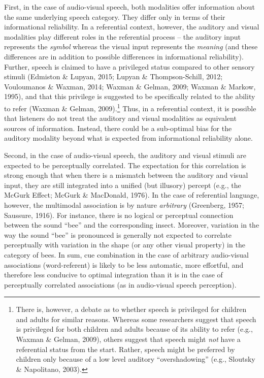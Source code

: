 \documentclass[english,,man,floatsintext]{apa6}
\let\rmarkdownfootnote\footnote%
\def\footnote{\protect\rmarkdownfootnote}
\theoremstyle{definition}
\theoremstyle{definition}
\theoremstyle{definition}
\theoremstyle{remark}
\begin{document}
First, in the case of audio-visual speech, both modalities offer
information about the same underlying speech category. They differ only
in terms of their informational reliability. In a referential context,
however, the auditory and visual modalities play different roles in the
referential process -- the auditory input represents the \emph{symbol}
whereas the visual input represents the \emph{meaning} (and these
differences are in addition to possible differences in informational
reliability). Further, speech is claimed to have a privileged status
compared to other sensory stimuli (Edmiston \& Lupyan, 2015; Lupyan \&
Thompson-Schill, 2012; Vouloumanos \& Waxman, 2014; Waxman \& Gelman,
2009; Waxman \& Markow, 1995), and that this privilege is suggested to
be specifically related to the ability to refer (Waxman \& Gelman,
2009).\footnote{There is, however, a debate as to whether speech is
  privileged for children and adults for similar reasons. Whereas some
  researchers suggest that speech is privileged for both children and
  adults because of its ability to refer (e.g., Waxman \& Gelman, 2009),
  others suggest that speech might \emph{not} have a referential status
  from the start. Rather, speech might be preferred by children only
  because of a low level auditory ``overshadowing'' (e.g., Sloutsky \&
  Napolitano, 2003).} Thus, in a referential context, it is possible
that listeners do not treat the auditory and visual modalities as
equivalent sources of information. Instead, there could be a sub-optimal
bias for the auditory modality beyond what is expected from
informational reliability alone.

Second, in the case of audio-visual speech, the auditory and visual
stimuli are expected to be perceptually correlated. The expectation for
this correlation is strong enough that when there is a mismatch between
the auditory and visual input, they are still integrated into a unified
(but illusory) percept (e.g., the McGurk Effect; McGurk \& MacDonald,
1976). In the case of referential language, however, the multimodal
association is by nature \emph{arbitrary} (Greenberg, 1957; Saussure,
1916). For instance, there is no logical or perceptual connection
between the sound \enquote{bee} and the corresponding insect. Moreover,
variation in the way the sound \enquote{bee} is pronounced is generally
not expected to correlate perceptually with variation in the shape (or
any other visual property) in the category of bees. In sum, cue
combination in the case of arbitrary audio-visual associations
(word-referent) is likely to be less automatic, more effortful, and
therefore less conducive to optimal integration than it is in the case
of perceptually correlated associations (as in audio-visual speech
perception).
\end{document}
